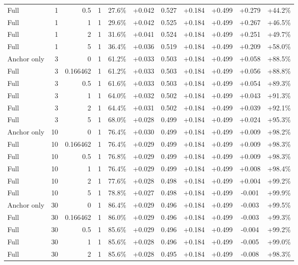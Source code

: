 \begin{table}[htbp]
\begin{tabular}{lrrrccccccc}
Full & 1 & 0.5 & 1 & 27.6\% & +0.042 & 0.527 & +0.184 & +0.499 & +0.279 & +44.2\% \\
Full & 1 & 1 & 1 & 29.6\% & +0.042 & 0.525 & +0.184 & +0.499 & +0.267 & +46.5\% \\
Full & 1 & 2 & 1 & 31.6\% & +0.041 & 0.524 & +0.184 & +0.499 & +0.251 & +49.7\% \\
Full & 1 & 5 & 1 & 36.4\% & +0.036 & 0.519 & +0.184 & +0.499 & +0.209 & +58.0\% \\
Anchor only & 3 & 0 & 1 & 61.2\% & +0.033 & 0.503 & +0.184 & +0.499 & +0.058 & +88.5\% \\
Full & 3 & 0.166462 & 1 & 61.2\% & +0.033 & 0.503 & +0.184 & +0.499 & +0.056 & +88.8\% \\
Full & 3 & 0.5 & 1 & 61.6\% & +0.033 & 0.503 & +0.184 & +0.499 & +0.054 & +89.3\% \\
Full & 3 & 1 & 1 & 64.0\% & +0.032 & 0.502 & +0.184 & +0.499 & +0.043 & +91.3\% \\
Full & 3 & 2 & 1 & 64.4\% & +0.031 & 0.502 & +0.184 & +0.499 & +0.039 & +92.1\% \\
Full & 3 & 5 & 1 & 68.0\% & +0.028 & 0.499 & +0.184 & +0.499 & +0.024 & +95.3\% \\
Anchor only & 10 & 0 & 1 & 76.4\% & +0.030 & 0.499 & +0.184 & +0.499 & +0.009 & +98.2\% \\
Full & 10 & 0.166462 & 1 & 76.4\% & +0.029 & 0.499 & +0.184 & +0.499 & +0.009 & +98.3\% \\
Full & 10 & 0.5 & 1 & 76.8\% & +0.029 & 0.499 & +0.184 & +0.499 & +0.009 & +98.3\% \\
Full & 10 & 1 & 1 & 76.4\% & +0.029 & 0.499 & +0.184 & +0.499 & +0.008 & +98.4\% \\
Full & 10 & 2 & 1 & 77.6\% & +0.028 & 0.498 & +0.184 & +0.499 & +0.004 & +99.2\% \\
Full & 10 & 5 & 1 & 78.8\% & +0.027 & 0.498 & +0.184 & +0.499 & -0.001 & +99.9\% \\
Anchor only & 30 & 0 & 1 & 86.4\% & +0.029 & 0.496 & +0.184 & +0.499 & -0.003 & +99.5\% \\
Full & 30 & 0.166462 & 1 & 86.0\% & +0.029 & 0.496 & +0.184 & +0.499 & -0.003 & +99.3\% \\
Full & 30 & 0.5 & 1 & 85.6\% & +0.029 & 0.496 & +0.184 & +0.499 & -0.004 & +99.2\% \\
Full & 30 & 1 & 1 & 85.6\% & +0.028 & 0.496 & +0.184 & +0.499 & -0.005 & +99.0\% \\
Full & 30 & 2 & 1 & 85.6\% & +0.028 & 0.495 & +0.184 & +0.499 & -0.008 & +98.3\% \\

\end{tabular}
\end{table}
